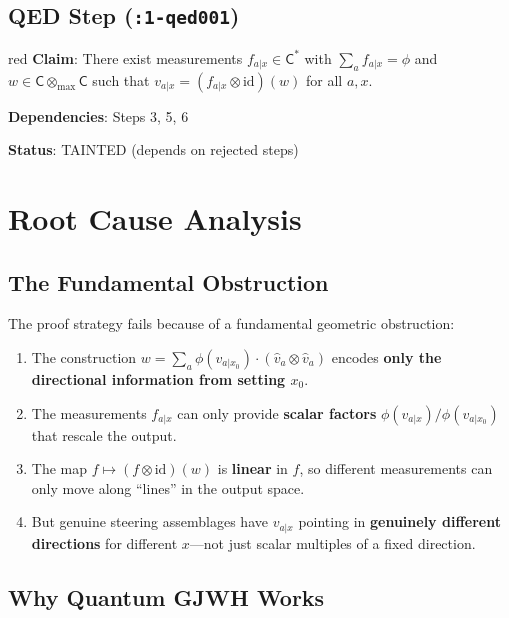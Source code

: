 \documentclass[11pt,a4paper]{article}
\theoremstyle{definition}
\newcommand{\C}{\mathsf{C}}
\newcommand{\Cstar}{\mathsf{C}^*}
\newcommand{\tmax}{\otimes_{\max}}
\newcommand{\id}{\mathrm{id}}
\begin{document}
\subsection{QED Step (\texttt{:1-qed001})}

\begin{statusbox}{red}
\textbf{Claim}: There exist measurements $f_{a|x} \in \Cstar$ with $\sum_a f_{a|x} = \phi$ and $w \in \C \tmax \C$ such that $v_{a|x} = (f_{a|x} \otimes \id)(w)$ for all $a, x$.

\textbf{Dependencies}: Steps 3, 5, 6

\textbf{Status}: TAINTED (depends on rejected steps)
\end{statusbox}

\section{Root Cause Analysis}

\subsection{The Fundamental Obstruction}

The proof strategy fails because of a fundamental geometric obstruction:

\begin{enumerate}
    \item The construction $w = \sum_a \phi(v_{a|x_0}) \cdot (\hat{v}_a \otimes \hat{v}_a)$ encodes \textbf{only the directional information from setting $x_0$}.

    \item The measurements $f_{a|x}$ can only provide \textbf{scalar factors} $\phi(v_{a|x})/\phi(v_{a|x_0})$ that rescale the output.

    \item The map $f \mapsto (f \otimes \id)(w)$ is \textbf{linear} in $f$, so different measurements can only move along ``lines'' in the output space.

    \item But genuine steering assemblages have $v_{a|x}$ pointing in \textbf{genuinely different directions} for different $x$---not just scalar multiples of a fixed direction.
\end{enumerate}

\subsection{Why Quantum GJWH Works}
\end{document}
